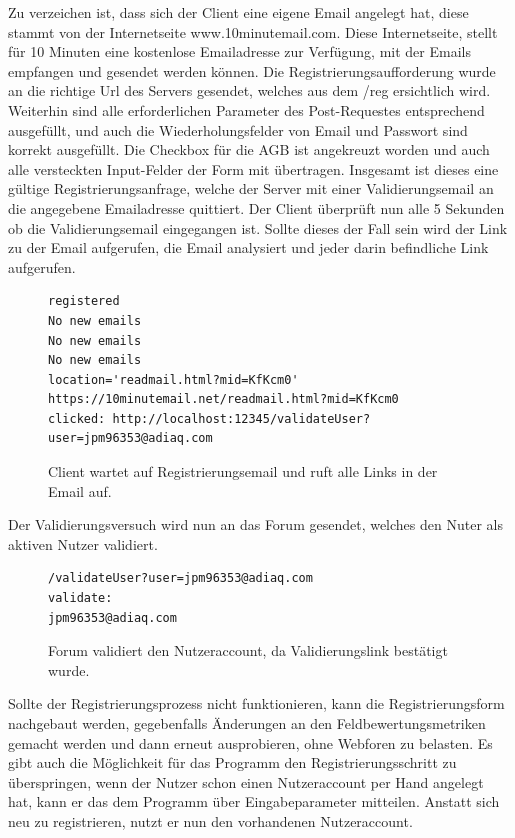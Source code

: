 Zu verzeichen ist, dass sich der Client eine eigene Email angelegt hat, diese stammt von der Internetseite www.10minutemail.com.
Diese Internetseite, stellt für 10 Minuten eine kostenlose Emailadresse zur Verfügung, mit der Emails empfangen und gesendet werden können.
Die Registrierungsaufforderung wurde an die richtige Url des Servers gesendet, welches aus dem /reg ersichtlich wird. Weiterhin sind alle erforderlichen Parameter des Post-Requestes entsprechend ausgefüllt, und auch die Wiederholungsfelder von Email und Passwort sind korrekt ausgefüllt. Die Checkbox für die AGB ist angekreuzt worden und auch alle versteckten Input-Felder der Form mit übertragen. Insgesamt ist dieses eine gültige Registrierungsanfrage, welche der Server mit einer Validierungsemail an die angegebene Emailadresse quittiert.
\newpage
Der Client überprüft nun alle 5 Sekunden ob die Validierungsemail eingegangen ist. Sollte dieses der Fall sein wird der Link zu der Email aufgerufen, die Email analysiert und jeder darin befindliche Link aufgerufen.

\begin{figure}[ht]
\begin{lstlisting}[language=HTML5]
registered
No new emails
No new emails
No new emails
location='readmail.html?mid=KfKcm0'
https://10minutemail.net/readmail.html?mid=KfKcm0
clicked: http://localhost:12345/validateUser?user=jpm96353@adiaq.com
\end{lstlisting}
\caption{Client wartet auf Registrierungsemail und ruft alle Links in der Email auf.}
\end{figure}


Der Validierungsversuch wird nun an das Forum gesendet, welches den Nuter als aktiven Nutzer validiert.

\begin{figure}[ht]
\begin{lstlisting}[language=HTML5]
/validateUser?user=jpm96353@adiaq.com
validate:
jpm96353@adiaq.com
\end{lstlisting}
\caption{Forum validiert den Nutzeraccount, da Validierungslink bestätigt wurde.}
\end{figure}

Sollte der Registrierungsprozess nicht funktionieren, kann die Registrierungsform nachgebaut werden, gegebenfalls Änderungen an den Feldbewertungsmetriken gemacht werden und dann erneut ausprobieren, ohne Webforen zu belasten. Es gibt auch die Möglichkeit für das Programm den Registrierungsschritt zu überspringen, wenn der Nutzer schon einen Nutzeraccount per Hand angelegt hat, kann er das dem Programm über Eingabeparameter mitteilen. Anstatt sich neu zu registrieren, nutzt er nun den vorhandenen Nutzeraccount.
\newpage


